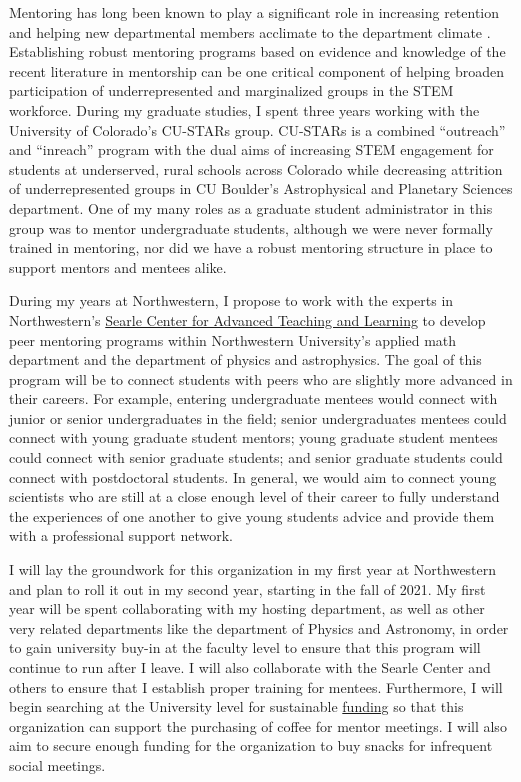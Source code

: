 \documentclass[aasms,12pt]{article}
\begin{document}
Mentoring has long been known to play a significant role in increasing retention and helping new departmental members acclimate to the department climate \citep{hunt&michael1983}.
Establishing robust mentoring programs based on evidence and knowledge of the recent literature in mentorship \citep[as in e.g.,][]{crisp&all2009, crisp&all2017} can be one critical component of helping broaden participation of underrepresented and marginalized groups in the STEM workforce.
During my graduate studies, I spent three years working with the University of Colorado's CU-STARs group.
CU-STARs is a combined ``outreach'' and ``inreach'' program with the dual aims of increasing STEM engagement for students at underserved, rural schools across Colorado while decreasing attrition of underrepresented groups in CU Boulder's Astrophysical and Planetary Sciences department.
One of my many roles as a graduate student administrator in this group was to mentor undergraduate students, although we were never formally trained in mentoring, nor did we have a robust mentoring structure in place to support mentors and mentees alike.

During my years at Northwestern, I propose to work with the experts in Northwestern's \href{https://www.northwestern.edu/searle/index.html}{Searle Center for Advanced Teaching and Learning} to develop peer mentoring programs within Northwestern University's applied math department and the department of physics and astrophysics.
The goal of this program will be to connect students with peers who are slightly more advanced in their careers.
For example, entering undergraduate mentees would connect with junior or senior undergraduates in the field; senior undergraduates mentees could connect with young graduate student mentors; young graduate student mentees could connect with senior graduate students; and senior graduate students could connect with postdoctoral students.
In general, we would aim to connect young scientists who are still at a close enough level of their career to fully understand the experiences of one another to give young students advice and provide them with a professional support network.

I will lay the groundwork for this organization in my first year at Northwestern and plan to roll it out in my second year, starting in the fall of 2021.
My first year will be spent collaborating with my hosting department, as well as other very related departments like the department of Physics and Astronomy, in order to gain university buy-in at the faculty level to ensure that this program will continue to run after I leave.
I will also collaborate with the Searle Center and others to ensure that I establish proper training for mentees.
Furthermore, I will begin searching at the University level for sustainable \href{https://www.northwestern.edu/studentorgs/org-officers/funding/index.html}{funding} so that this organization can support the purchasing of coffee for mentor meetings.
I will also aim to secure enough funding for the organization to buy snacks for infrequent social meetings.
\end{document}
